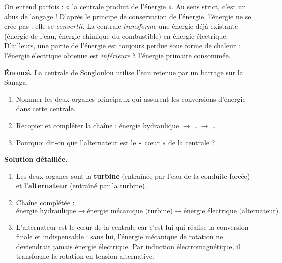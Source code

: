 \documentclass[11pt]{article}
\newcommand{\cle}[1]{{\popxbold\color{popdark}#1}}
\begin{document}
\begin{attention}
On entend parfois : « la centrale produit de l'énergie ». Au sens strict, c'est un abus de langage ! D'après le principe de \cle{conservation de l'énergie}, l'énergie ne se crée pas : elle se \emph{convertit}. La centrale \emph{transforme} une énergie déjà existante (énergie de l'eau, énergie chimique du combustible) en énergie électrique. D'ailleurs, une partie de l'énergie est toujours perdue sous forme de chaleur : l'énergie électrique obtenue est \emph{inférieure} à l'énergie primaire consommée.
\end{attention}

\begin{exoresolu}
\textbf{Énoncé.} La centrale de Songloulou utilise l'eau retenue par un barrage sur la Sanaga.
\begin{enumerate}
\item Nommer les deux organes principaux qui assurent les conversions d'énergie dans cette centrale.
\item Recopier et compléter la chaîne : énergie hydraulique $\rightarrow$ \ldots $\rightarrow$ \ldots
\item Pourquoi dit-on que l'alternateur est le « cœur » de la centrale ?
\end{enumerate}
\tcblower
\textbf{Solution détaillée.}
\begin{enumerate}
\item Les deux organes sont la \textbf{turbine} (entraînée par l'eau de la conduite forcée) et l'\textbf{alternateur} (entraîné par la turbine).
\item Chaîne complétée :
\[ \text{énergie hydraulique} \rightarrow \text{énergie mécanique (turbine)} \rightarrow \text{énergie électrique (alternateur)} \]
\item L'alternateur est le cœur de la centrale car c'est lui qui réalise la conversion finale et indispensable : sans lui, l'énergie mécanique de rotation ne deviendrait jamais énergie électrique. Par induction électromagnétique, il transforme la rotation en tension alternative.
\end{enumerate}
\end{exoresolu}
\end{document}
